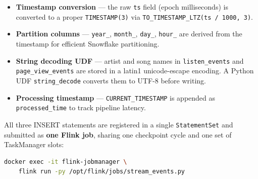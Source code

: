 \begin{itemize}
  \item \textbf{Timestamp conversion} — the raw \texttt{ts} field (epoch milliseconds) is converted
        to a proper \texttt{TIMESTAMP(3)} via \texttt{TO\_TIMESTAMP\_LTZ(ts / 1000, 3)}.
  \item \textbf{Partition columns} — \texttt{year\_}, \texttt{month\_}, \texttt{day\_}, \texttt{hour\_}
        are derived from the timestamp for efficient Snowflake partitioning.
  \item \textbf{String decoding UDF} — artist and song names in \texttt{listen\_events} and
        \texttt{page\_view\_events} are stored in a latin1 unicode-escape encoding.
        A Python UDF \texttt{string\_decode} converts them to UTF-8 before writing.
  \item \textbf{Processing timestamp} — \texttt{CURRENT\_TIMESTAMP} is appended as \texttt{processed\_time}
        to track pipeline latency.
\end{itemize}

All three INSERT statements are registered in a single \texttt{StatementSet} and submitted as
\textbf{one Flink job}, sharing one checkpoint cycle and one set of TaskManager slots:

\begin{lstlisting}[language=bash, caption={Submitting the PyFlink job after \texttt{docker compose up}.}]
docker exec -it flink-jobmanager \
    flink run -py /opt/flink/jobs/stream_events.py
\end{lstlisting}
